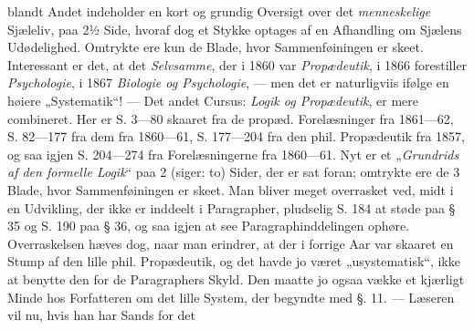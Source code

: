 \documentclass[12pt,a4paper]{book}
\newcommand{\opage}[1]{\marginnote{\footnotesize\textit{[#1]}}}
\begin{document}
blandt Andet indeholder en kort og grundig Oversigt over det \emph{menneskelige}
Sjæleliv, paa 2½ Side, hvoraf dog et Stykke optages af en Afhandling om Sjælens
Udødelighed. Omtrykte ere kun de Blade, hvor Sammenføiningen er skeet.
Interessant er det, at det \emph{Selvsamme}, der i 1860 var \emph{Propædeutik},
i 1866 forestiller \emph{Psychologie}, i 1867 \emph{Biologie og Psychologie},
--- men det er naturligviis ifølge en høiere „Systematik“! --- Det andet Cursus:
\emph{Logik og Propædeutik}, er mere combineret. Her er S. 3---80 skaaret fra de
propæd. Forelæsninger fra 1861---62, S. 82---177 fra dem fra 1860---61,
S. 177---204 fra den phil. Propædeutik fra 1857, og saa igjen S. 204---274 fra
Forelæsningerne fra 1860---61.
\opage{26} Nyt er et „\emph{Grundrids af den formelle Logik}“ paa 2 (siger: to) Sider, der
er sat foran; omtrykte ere de 3 Blade, hvor Sammenføiningen er skeet. Man bliver
meget overrasket ved, midt i en Udvikling, der ikke er inddeelt i Paragrapher,
pludselig S. 184 at støde paa § 35 og S. 190 paa § 36, og saa igjen at see
Paragraphinddelingen ophøre. Overraskelsen hæves dog, naar man erindrer, at der
i forrige Aar var skaaret en Stump af den lille phil. Propædeutik, og det havde
jo været „usystematisk“, ikke at benytte den for de Paragraphers Skyld. Den
maatte jo ogsaa vække et kjærligt Minde hos Forfatteren om det lille System, der
begyndte med §. 11. --- Læseren vil nu, hvis han har Sands for det
\end{document}
